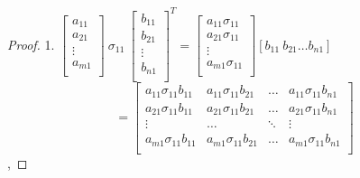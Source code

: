 \documentclass[12pt,a4paper]{report}
\begin{document}
\begin{proof}
1.
$\left[ \begin{array}{c}
         a_{11} \\
         a_{21} \\
         \vdots \\
         a_{m1} \\
         \end{array}
      \right] \: \sigma_{11} \: \left[ \begin{array}{c}
         b_{11} \\
         b_{21} \\
         \vdots \\
         b_{n1} \\
         \end{array}
      \right]^T = \left[
        \begin{array}{c}
         a_{11} \sigma_{11} \\
         a_{21} \sigma_{11} \\
         \vdots \\
         a_{m1} \sigma_{11} \\
         \end{array}
      \right] [b_{11} \: b_{21} \ldots b_{n1}]$
      $$ =  \left[
        \begin{array}{cccc}
         a_{11} \sigma_{11} b_{11}  & a_{11} \sigma_{11} b_{21} & \ldots & a_{11} \sigma_{11} b_{n1}  \\
         a_{21} \sigma_{11} b_{11} & a_{21} \sigma_{11} b_{21} & \ldots & a_{21} \sigma_{11} b_{n1} \\
         \vdots & \ldots & \ddots & \vdots \\
         a_{m1} \sigma_{11} b_{11} & a_{m1} \sigma_{11} b_{21} & \ldots & a_{m1} \sigma_{11} b_{n1} \\
         \end{array}
      \right] $$,


\end{proof}
\end{document}
